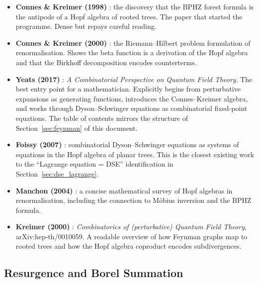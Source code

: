 \documentclass[11pt,a4paper]{article}
\theoremstyle{definition}
\begin{document}
\begin{itemize}[leftmargin=2em]
  \item \textbf{Connes \& Kreimer (1998)} \cite{conneskreimer1998}: the discovery
        that the BPHZ forest formula is the antipode of a Hopf algebra of rooted
        trees. The paper that started the programme. Dense but repays careful reading.

  \item \textbf{Connes \& Kreimer (2000)} \cite{conneskreimer2000}: the
        Riemann--Hilbert problem formulation of renormalisation. Shows the beta
        function is a derivation of the Hopf algebra and that the Birkhoff
        decomposition encodes counterterms.

  \item \textbf{Yeats (2017)} \cite{yeats2017}: \emph{A Combinatorial Perspective
        on Quantum Field Theory}. The best entry point for a mathematician.
        Explicitly begins from perturbative expansions as generating functions,
        introduces the Connes--Kreimer algebra, and works through Dyson--Schwinger
        equations as combinatorial fixed-point equations. The table of contents
        mirrors the structure of Section~\ref{sec:feynman} of this document.

  \item \textbf{Foissy (2007)} \cite{foissy2007}: combinatorial Dyson--Schwinger
        equations as systems of equations in the Hopf algebra of planar trees.
        This is the closest existing work to the ``Lagrange equation = DSE''
        identification in Section~\ref{sec:dse_lagrange}.

  \item \textbf{Manchon (2004)} \cite{manchon2004}: a concise mathematical survey
        of Hopf algebras in renormalisation, including the connection to
        M\"obius inversion and the BPHZ formula.

  \item \textbf{Kreimer (2000)} \cite{kreimer2000}: \emph{Combinatorics of (perturbative) Quantum
        Field Theory}, arXiv:hep-th/0010059. A readable overview of how Feynman
        graphs map to rooted trees and how the Hopf algebra coproduct encodes
        subdivergences.
\end{itemize}

\subsection{Resurgence and Borel Summation}
\end{document}
